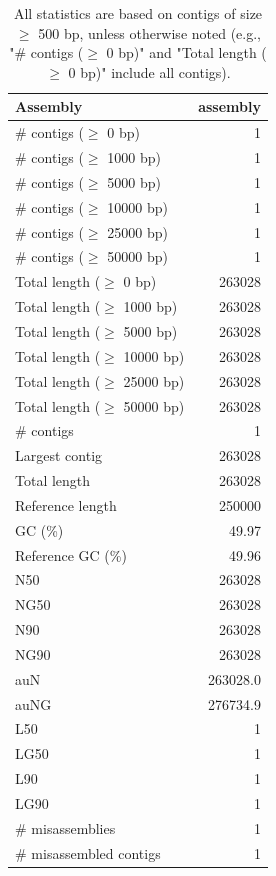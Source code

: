 \documentclass[12pt,a4paper]{article}
\begin{document}
\begin{table}[ht]
\begin{center}
\caption{All statistics are based on contigs of size $\geq$ 500 bp, unless otherwise noted (e.g., "\# contigs ($\geq$ 0 bp)" and "Total length ($\geq$ 0 bp)" include all contigs).}
\begin{tabular}{|l*{1}{|r}|}
\hline
Assembly & assembly \\ \hline
\# contigs ($\geq$ 0 bp) & 1 \\ \hline
\# contigs ($\geq$ 1000 bp) & 1 \\ \hline
\# contigs ($\geq$ 5000 bp) & 1 \\ \hline
\# contigs ($\geq$ 10000 bp) & 1 \\ \hline
\# contigs ($\geq$ 25000 bp) & 1 \\ \hline
\# contigs ($\geq$ 50000 bp) & 1 \\ \hline
Total length ($\geq$ 0 bp) & 263028 \\ \hline
Total length ($\geq$ 1000 bp) & 263028 \\ \hline
Total length ($\geq$ 5000 bp) & 263028 \\ \hline
Total length ($\geq$ 10000 bp) & 263028 \\ \hline
Total length ($\geq$ 25000 bp) & 263028 \\ \hline
Total length ($\geq$ 50000 bp) & 263028 \\ \hline
\# contigs & 1 \\ \hline
Largest contig & 263028 \\ \hline
Total length & 263028 \\ \hline
Reference length & 250000 \\ \hline
GC (\%) & 49.97 \\ \hline
Reference GC (\%) & 49.96 \\ \hline
N50 & 263028 \\ \hline
NG50 & 263028 \\ \hline
N90 & 263028 \\ \hline
NG90 & 263028 \\ \hline
auN & 263028.0 \\ \hline
auNG & 276734.9 \\ \hline
L50 & 1 \\ \hline
LG50 & 1 \\ \hline
L90 & 1 \\ \hline
LG90 & 1 \\ \hline
\# misassemblies & 1 \\ \hline
\# misassembled contigs & 1 \\ \hline

\end{tabular}
\end{center}
\end{table}
\end{document}
